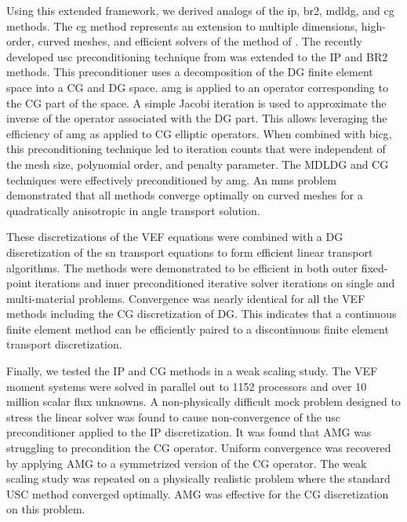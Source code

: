 \documentclass[../doc.tex]{subfiles}
\begin{document}
Using this extended framework, we derived analogs of the \gls{ip}, \gls{br2}, \gls{mdldg}, and \gls{cg} methods. The \gls{cg} method represents an extension to multiple dimensions, high-order, curved meshes, and efficient solvers of the method of \textcite{two-level-independent-warsa}. 
The recently developed \gls{usc} preconditioning technique from \textcite{Pazner2021} was extended to the IP and BR2 methods. This preconditioner uses a decomposition of the DG finite element space into a CG and DG space. \gls{amg} is applied to an operator corresponding to the CG part of the space. A simple Jacobi iteration is used to approximate the inverse of the operator associated with the DG part. This allows leveraging the efficiency of \gls{amg} as applied to CG elliptic operators. When combined with \gls{bicg}, this preconditioning technique led to iteration counts that were independent of the mesh size, polynomial order, and penalty parameter. The MDLDG and CG techniques were effectively preconditioned by \gls{amg}. An \gls{mms} problem demonstrated that all methods converge optimally on curved meshes for a quadratically anisotropic in angle transport solution. 

These discretizations of the VEF equations were combined with a DG discretization of the \gls{sn} transport equations to form efficient linear transport algorithms. The methods were demonstrated to be efficient in both outer fixed-point iterations and inner preconditioned iterative solver iterations on single and multi-material problems. Convergence was nearly identical for all the VEF methods including the CG discretization of DG. This indicates that a continuous finite element method can be efficiently paired to a discontinuous finite element transport discretization. 

Finally, we tested the IP and CG methods in a weak scaling study. The VEF moment systems were solved in parallel out to 1152 processors and over 10 million scalar flux unknowns. 
A non-physically difficult mock problem designed to stress the linear solver was found to cause non-convergence of the \gls{usc} preconditioner applied to the IP discretization. It was found that AMG was struggling to precondition the CG operator. Uniform convergence was recovered by applying AMG to a symmetrized version of the CG operator. The weak scaling study was repeated on a physically realistic problem where the standard USC method converged optimally. AMG was effective for the CG discretization on this problem. 
\end{document}
